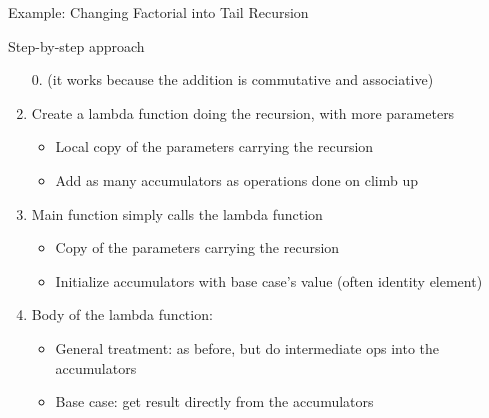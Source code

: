 \begin{frame}{Example: Changing Factorial into Tail Recursion}
  \begin{block}{Step-by-step approach}
    \begin{enumerate}
    \item[0.] (it works because the addition is commutative and associative)
    \item Create a lambda function doing the recursion, with more parameters
      \begin{itemize}
      \item Local copy of the parameters carrying the recursion
      \item Add as many accumulators as operations done on climb up
      \end{itemize}
    \item<2-> Main function simply calls the lambda function
      \begin{itemize}
      \item Copy of the parameters carrying the recursion
      \item Initialize accumulators with base case's value (often identity element)
      \end{itemize}
    \item<3-> Body of the lambda function:
      \begin{itemize}
      \item General treatment: as before, but do intermediate ops into the accumulators
      \item<4-> Base case: get result directly from the accumulators
      \end{itemize}
    \end{enumerate}
  \end{block}
\end{frame}
